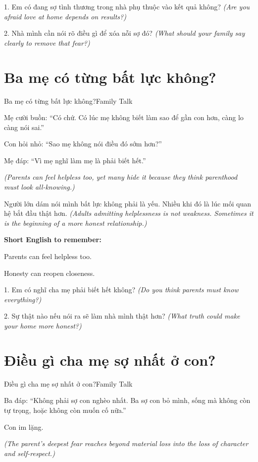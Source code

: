 \begin{tuhocnhanh}
1. Em có đang sợ tình thương trong nhà phụ thuộc vào kết quả không? \textit{(Are you afraid love at home depends on results?)}

2. Nhà mình cần nói rõ điều gì để xóa nỗi sợ đó? \textit{(What should your family say clearly to remove that fear?)}
\end{tuhocnhanh}
\ngancach

\section{Ba mẹ có từng bất lực không?}
\begin{truyen}{Ba mẹ có từng bất lực không?}{Family Talk}

Mẹ cười buồn: ``Có chứ. Có lúc mẹ không biết làm sao để gần con hơn, càng lo càng nói sai.''

Con hỏi nhỏ: ``Sao mẹ không nói điều đó sớm hơn?''

Mẹ đáp: ``Vì mẹ nghĩ làm mẹ là phải biết hết.''

\textit{(Parents can feel helpless too, yet many hide it because they think parenthood must look all-knowing.)}
\end{truyen}

\begin{baihoc}
Người lớn dám nói mình bất lực không phải là yếu. Nhiều khi đó là lúc mối quan hệ bắt đầu thật hơn.
\textit{(Adults admitting helplessness is not weakness. Sometimes it is the beginning of a more honest relationship.)}
\end{baihoc}

\begin{ghinhoanh}
\textbf{Short English to remember:}

Parents can feel helpless too.

Honesty can reopen closeness.
\end{ghinhoanh}

\begin{tuhocnhanh}
1. Em có nghĩ cha mẹ phải biết hết không? \textit{(Do you think parents must know everything?)}

2. Sự thật nào nếu nói ra sẽ làm nhà mình thật hơn? \textit{(What truth could make your home more honest?)}
\end{tuhocnhanh}
\ngancach

\section{Điều gì cha mẹ sợ nhất ở con?}
\begin{truyen}{Điều gì cha mẹ sợ nhất ở con?}{Family Talk}

Ba đáp: ``Không phải sợ con nghèo nhất. Ba sợ con bỏ mình, sống mà không còn tự trọng, hoặc không còn muốn cố nữa.''

Con im lặng.

\textit{(The parent's deepest fear reaches beyond material loss into the loss of character and self-respect.)}
\end{truyen}

